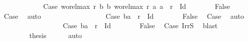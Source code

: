 \begin{isabellebody}
\ \ \ \ \ \isamarkupfalse%
\isanewline
\ \ \ \ \ \isacommand{{\isacharbraceleft}{\kern0pt}}\isamarkupfalse%
\isamarkupfalse%
\ Case{}{}{\isacharcolon}{\kern0pt}\ {\isachardoublequoteopen}{\isacharparenleft}{\kern0pt}wo{\isacharunderscore}{\kern0pt}rel{\isachardot}{\kern0pt}max{}\ r\ b{}\ b{}{\isacharcomma}{\kern0pt}\ wo{\isacharunderscore}{\kern0pt}rel{\isachardot}{\kern0pt}max{}\ r\ a{}\ a{}{\isacharparenright}{\kern0pt}\ {\isasymin}\ r\ {\isacharminus}{\kern0pt}\ Id{\isachardoublequoteclose}\isanewline
\ \ \ \ \ \ \isamarkupfalse%
\ False\ \isamarkupfalse%
\ Case{}\ \isamarkupfalse%
\ auto\isanewline
\ \ \ \ \ \isacommand{{\isacharbraceright}{\kern0pt}}\isamarkupfalse%
\isanewline
\ \ \ \ \ \isamarkupfalse%
\isanewline
\ \ \ \ \ \isacommand{{\isacharbraceleft}{\kern0pt}}\isamarkupfalse%
\isamarkupfalse%
\ Case{}{}{\isacharcolon}{\kern0pt}\ {\isachardoublequoteopen}{\isacharparenleft}{\kern0pt}b{}{\isacharcomma}{\kern0pt}a{}{\isacharparenright}{\kern0pt}\ {\isasymin}\ r\ {\isacharminus}{\kern0pt}\ Id{\isachardoublequoteclose}\isanewline
\ \ \ \ \ \ \isamarkupfalse%
\ False\ \isamarkupfalse%
\ Case{}\ \isamarkupfalse%
\ auto\isanewline
\ \ \ \ \ \isacommand{{\isacharbraceright}{\kern0pt}}\isamarkupfalse%
\isanewline
\ \ \ \ \ \isamarkupfalse%
\isanewline
\ \ \ \ \ \isacommand{{\isacharbraceleft}{\kern0pt}}\isamarkupfalse%
\isamarkupfalse%
\ Case{}{}{\isacharcolon}{\kern0pt}\ {\isachardoublequoteopen}{\isacharparenleft}{\kern0pt}b{}{\isacharcomma}{\kern0pt}a{}{\isacharparenright}{\kern0pt}\ {\isasymin}\ r\ {\isacharminus}{\kern0pt}\ Id{\isachardoublequoteclose}\isanewline
\ \ \ \ \ \ \isamarkupfalse%
\ False\ \isamarkupfalse%
\ Case{}\ IrrS\ \isamarkupfalse%
\ blast\isanewline
\ \ \ \ \ \isacommand{{\isacharbraceright}{\kern0pt}}\isamarkupfalse%
\isanewline
\ \ \ \ \ \isamarkupfalse%
\ \isamarkupfalse%
\ {\isacharquery}{\kern0pt}thesis\ \isamarkupfalse%
\ {}\ {}\ \isamarkupfalse%
\ auto\isanewline
\ \ \ \ \isacommand{{\isacharbraceright}{\kern0pt}}\isamarkupfalse%
\isanewline

\end{isabellebody}
